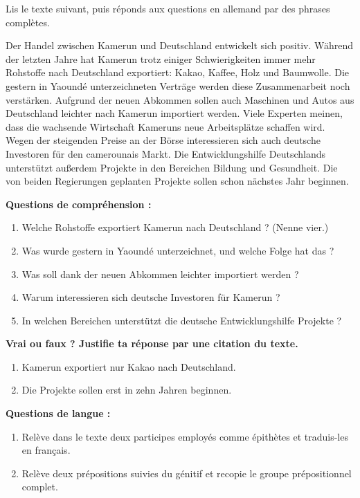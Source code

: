 \documentclass[11pt]{article}
\begin{document}
\begin{exercice}
Lis le texte suivant, puis réponds aux questions en allemand par des phrases complètes.

\begin{textebox}
Der Handel zwischen Kamerun und Deutschland entwickelt sich positiv. Während der letzten Jahre hat Kamerun trotz einiger Schwierigkeiten immer mehr Rohstoffe nach Deutschland exportiert: Kakao, Kaffee, Holz und Baumwolle. Die gestern in Yaoundé unterzeichneten Verträge werden diese Zusammenarbeit noch verstärken. Aufgrund der neuen Abkommen sollen auch Maschinen und Autos aus Deutschland leichter nach Kamerun importiert werden. Viele Experten meinen, dass die wachsende Wirtschaft Kameruns neue Arbeitsplätze schaffen wird. Wegen der steigenden Preise an der Börse interessieren sich auch deutsche Investoren für den camerounais Markt. Die Entwicklungshilfe Deutschlands unterstützt außerdem Projekte in den Bereichen Bildung und Gesundheit. Die von beiden Regierungen geplanten Projekte sollen schon nächstes Jahr beginnen.
\end{textebox}

\textbf{Questions de compréhension :}
\begin{enumerate}
\item Welche Rohstoffe exportiert Kamerun nach Deutschland ? (Nenne vier.)
\item Was wurde gestern in Yaoundé unterzeichnet, und welche Folge hat das ?
\item Was soll dank der neuen Abkommen leichter importiert werden ?
\item Warum interessieren sich deutsche Investoren für Kamerun ?
\item In welchen Bereichen unterstützt die deutsche Entwicklungshilfe Projekte ?
\end{enumerate}

\textbf{Vrai ou faux ? Justifie ta réponse par une citation du texte.}
\begin{enumerate}
\item Kamerun exportiert nur Kakao nach Deutschland.
\item Die Projekte sollen erst in zehn Jahren beginnen.
\end{enumerate}

\textbf{Questions de langue :}
\begin{enumerate}
\item Relève dans le texte deux participes employés comme épithètes et traduis-les en français.
\item Relève deux prépositions suivies du génitif et recopie le groupe prépositionnel complet.
\end{enumerate}
\end{exercice}
\end{document}
